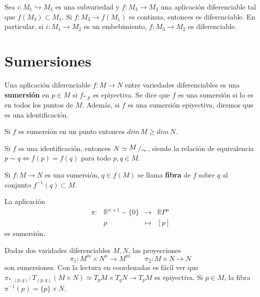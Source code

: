 \begin{prop}
Sea $i:M_1 \hookrightarrow M_2$ es una subvariedad y $f: M_3 \to M_2$ una aplicación diferenciable tal que $f(M_3) \subset M_1$. Si $f:M_3 \to f(M_1)$ es continua, entonces es diferenciable. En particular, si $i: M_1 \to M_2$ es un embebimiento, $f:M_3 \to M_2$ es diferenciable.
\end{prop}

\section{Sumersiones}
\begin{defi}
Una aplicación diferenciable $f:M\longrightarrow N$ entre variedades diferenciables es una \textbf{sumersión} en $p \in M$ si $f_{*,p}$ es epiyectiva. Se dice que $f$ es una sumersión si lo es en todos los puntos de $M$. Además, si $f$ es una sumersión epiyectiva, diremos que es una identificación.
\end{defi}

\begin{obs}
Si $f$ es sumersión en un punto entonces $dim\,M \geq dim\,N$.
\end{obs}

\begin{obs}
Si $f$ es una identificación, entonces $N \simeq \modulo{M}{\sim}$, siendo la relación de equivalencia $p \sim q \iff f(p)=f(q)$ para todo $p,q \in M$.
\end{obs}

\begin{defi}
Si $f: M \to N$ es una sumersión, $q \in f(M)$ se llama \textbf{fibra} de $f$ sobre $q$ al conjunto $f^{-1}(q) \subset M$.
\end{defi}

\begin{ejem} La aplicaci\'on
$$\begin{array}{rrcl}
     \pi : & \mathbb R^{n+1}-\{0\} & \longrightarrow & \mathbb RP^{n}  \\
     & p & \longmapsto & [p]
\end{array}$$
es sumersi\'on.

Dadas dos varidades diferenciables $M,N$, las proyecciones
$$\pi_1: M^m \times N^n \to M^m \qquad \pi_2:M\times N \to N$$
son sumersiones. Con la lectura en coordenadas es fácil ver que $\pi_{*,(p,q)}:T_{(p,q)}(M\times N)\simeq T_pM \times T_qN \to T_pM$ es epiyectiva. Si $p \in M$, la fibra $\pi^{-1}(p) = \{p\} \times N$.
\end{ejem}


